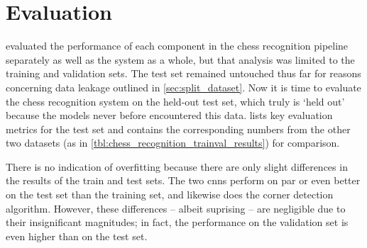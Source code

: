 \documentclass[../report.tex]{subfiles}
\begin{document}
\chapter{Evaluation}
\label{chap:evaluation}
 evaluated the performance of each component in the chess recognition pipeline separately as well as the system as a whole, but that analysis was limited to the training and validation sets.
The test set remained untouched thus far for reasons concerning data leakage outlined in \cref{sec:split_dataset}.
Now it is time to evaluate the chess recognition system on the held-out test set, which truly is `held out' because the models never before encountered this data.
 lists key evaluation metrics for the test set and contains the corresponding numbers from the other two datasets (as in \cref{tbl:chess_recognition_trainval_results}) for comparison.
\begin{table}
    \caption[Performance of the chess recognition system on the test dataset.]{Performance of the chess recognition system on the test dataset. The training and validation metrics as per \cref{tbl:chess_recognition_trainval_results} are included for comparison.}
    \label{tbl:chess_recognition_trainvaltest_results}
\end{table}
There is no indication of overfitting because there are only slight differences in the results of the train and test sets.
The two \glspl{cnn} perform on par or even better on the test set than the training set, and likewise does the corner detection algorithm.
However, these differences -- albeit suprising -- are negligible due to their insignificant magnitudes; in fact, the performance on the validation set is even higher than on the test set.
\end{document}
